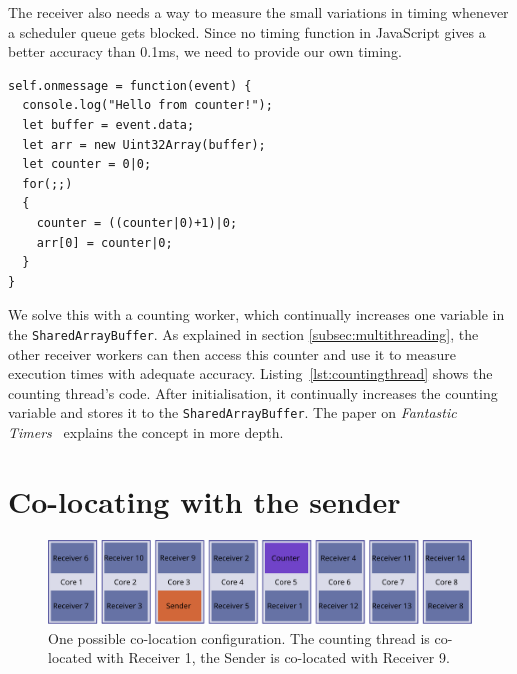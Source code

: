 \documentclass[11pt,
  titlepage=false,
  parskip=half,      %
]{scrreprt}
\begin{document}

The receiver also needs a way to measure the small variations in timing whenever a scheduler queue gets blocked.
Since no timing function in JavaScript gives a better accuracy than 0.1ms, we need to provide our own timing.


\begin{lstlisting}[float,caption={The code for the counting thread},label={lst:countingthread}]
self.onmessage = function(event) {
  console.log("Hello from counter!");
  let buffer = event.data;
  let arr = new Uint32Array(buffer);
  let counter = 0|0;
  for(;;)
  {
    counter = ((counter|0)+1)|0;
    arr[0] = counter|0;
  }
}
\end{lstlisting}

We solve this with a counting worker, which continually increases one variable in the \texttt{SharedArrayBuffer}.
As explained in section \ref{subsec:multithreading}, the other receiver workers can then access this counter and use it to measure execution times with adequate accuracy.
Listing~\ref{lst:countingthread} shows the counting thread's code.
After initialisation, it continually increases the counting variable and stores it to the \texttt{SharedArrayBuffer}.
The paper on \textit{Fantastic Timers}~\cite{Schwarz2017Timers} explains the concept in more depth.

\section{Co-locating with the sender}
\label{sec:co-location}

\begin{figure}
\centering
\includegraphics[width=\textwidth]{figures/colocation}

\caption{One possible co-location configuration. The counting thread is co-located with Receiver 1, the Sender is co-located with Receiver 9.}
\label{fig:colocation}

\end{figure}
\end{document}
